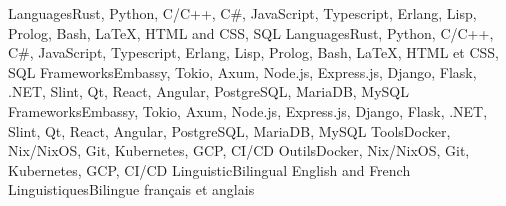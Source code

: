     \resumeEnumerationStart
        \resumeEnumerationEnFr
            {Languages}{Rust, Python, C/C++, C\#, JavaScript, Typescript, Erlang, Lisp, Prolog, Bash, LaTeX, HTML and CSS, SQL}
            {Languages}{Rust, Python, C/C++, C\#, JavaScript, Typescript, Erlang, Lisp, Prolog, Bash, LaTeX, HTML et CSS, SQL}
        \resumeEnumerationEnFr
            {Frameworks}{Embassy, Tokio, Axum, Node.js, Express.js, Django, Flask, .NET, Slint, Qt, React, Angular, PostgreSQL, MariaDB, MySQL}
            {Frameworks}{Embassy, Tokio, Axum, Node.js, Express.js, Django, Flask, .NET, Slint, Qt, React, Angular, PostgreSQL, MariaDB, MySQL}
        \resumeEnumerationEnFr
            {Tools}{Docker, Nix/NixOS, Git, Kubernetes, GCP, CI/CD}
            {Outils}{Docker, Nix/NixOS, Git, Kubernetes, GCP, CI/CD}
        \resumeEnumerationEnFr
            {Linguistic}{Bilingual English and French}
            {Linguistiques}{Bilingue français et anglais}
    \resumeEnumerationEnd

